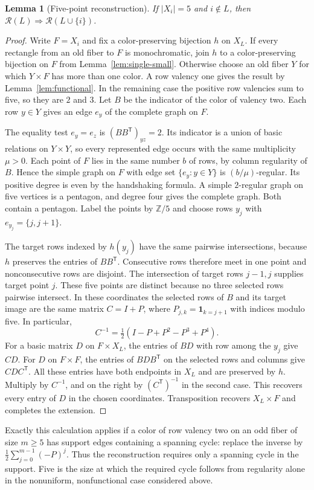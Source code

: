 \documentclass[11pt,reqno]{amsart}
\numberwithin{equation}{section}
\newtheorem{lemma}[theorem]{Lemma}
\theoremstyle{definition}
\begin{document}
\begin{lemma}[Five-point reconstruction]\label{lem:five-frame}
If $|X_i|=5$ and $i\notin L$, then
$\mathcal R(L)\Rightarrow\mathcal R(L\cup\{i\})$.
\end{lemma}
\begin{proof}
Write $F=X_i$ and fix a color-preserving bijection $h$ on $X_L$. If every
rectangle from an old fiber to $F$ is monochromatic, join $h$ to a color-preserving bijection on $F$ from Lemma~\ref{lem:single-small}. Otherwise
choose an old fiber $Y$ for which $Y\times F$ has more than one color.
A row valency one gives the result by Lemma~\ref{lem:functional}.
In the remaining case the positive row valencies sum to five, so they
are $2$ and $3$. Let $B$ be the indicator of the color of valency two.
Each row $y\in Y$ gives an edge $e_y$ of the complete graph on $F$.

The equality test $e_y=e_z$ is $(BB^{\mathsf T})_{yz}=2$. Its indicator
is a union of basic relations on $Y\times Y$, so every represented edge
occurs with the same multiplicity $\mu>0$. Each point of $F$ lies in
the same number $b$ of rows, by column regularity of $B$. Hence the
simple graph on $F$ with edge set $\{e_y:y\in Y\}$ is $(b/\mu)$-regular.
Its positive degree is even by the handshaking formula. A simple
$2$-regular graph on five vertices is a pentagon, and degree four gives
the complete graph. Both contain a pentagon. Label the points by
$\mathbb Z/5$ and choose rows $y_j$ with $e_{y_j}=\{j,j+1\}$.

The target rows indexed by $h(y_j)$ have the same pairwise intersections,
because $h$ preserves the entries of $BB^{\mathsf T}$. Consecutive rows
therefore meet in one point and nonconsecutive rows are disjoint. The
intersection of target rows $j-1,j$ supplies target point $j$. These five points are distinct because no three selected rows pairwise intersect. In these coordinates the selected rows of $B$ and
its target image are the same matrix $C=I+P$, where $P_{j,k}=\mathbf{1}_{k=j+1}$
with indices modulo five. In particular,
\[
 C^{-1}=\tfrac12(I-P+P^2-P^3+P^4).
\]
For a basic matrix $D$ on $F\times X_L$, the entries of $BD$ with row
among the $y_j$ give $CD$. For $D$ on $F\times F$, the entries of
$BDB^{\mathsf T}$ on the selected rows and columns give $CDC^{\mathsf T}$.
All these entries have both endpoints in $X_L$ and are preserved by $h$.
Multiply by $C^{-1}$, and on the right by $(C^{\mathsf T})^{-1}$ in the
second case. This recovers every entry of $D$ in the chosen coordinates. Transposition recovers $X_L\times F$ and completes
the extension.
\end{proof}
Exactly this calculation applies if a color of row valency two on an
odd fiber of size $m\ge5$ has support edges containing a spanning cycle:
replace the inverse by $\frac12\sum_{j=0}^{m-1}(-P)^j$. Thus the
reconstruction requires only a spanning cycle in the support. Five is
the size at which the required cycle follows from regularity alone
in the nonuniform, nonfunctional case considered above.
\end{document}
